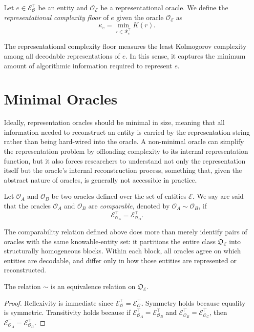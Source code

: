 \begin{definition}
Let $e \in \mathcal{E}_{\mathcal O}^{\top}$ be an entity and $\mathcal{O}_\mathcal{E}$ be a representational oracle. We define the \emph{representational complexity floor} of $e$ given the oracle $\mathcal{O}_\mathcal{E}$ as
\[
\kappa_e = \min_{r \in \mathcal{R}_{e}^{\top}} K(r).
\]
\end{definition}

The representational complexity floor measures the least Kolmogorov complexity among all decodable representations of $e$. In this sense, it captures the minimum amount of algorithmic information required to represent $e$.

%
%

\section{Minimal Oracles}
\label{sec:minimal_oracles}

Ideally, representation oracles should be minimal in size, meaning that all information needed to reconstruct an entity is carried by the representation string rather than being hard-wired into the oracle. A non-minimal oracle can simplify the representation problem by offloading complexity to its internal representation function, but it also forces researchers to understand not only the representation itself but the oracle's internal reconstruction process, something that, given the abstract nature of oracles, is generally not accessible in practice.

\begin{definition}
Let $\mathcal{O}_A$ and $\mathcal{O}_B$ be two oracles defined over the set of entities $\mathcal{E}$. We say are said that the oracles $\mathcal{O}_A$ and $\mathcal{O}_B$ are \emph{comparable}, denoted by $\mathcal O_A \sim \mathcal O_B$, if
\[
\mathcal{E}_{\mathcal{O}_{A}}^{\top} = \mathcal{E}_{\mathcal{O}_{B}}^{\top}.
\]
\end{definition}

The comparability relation defined above does more than merely identify pairs of oracles with the same knowable-entity set: it partitions the entire class $\mathfrak O_{\mathcal E}$ into structurally homogeneous blocks. Within each block, all oracles agree on which entities are decodable, and differ only in how those entities are represented or reconstructed.

\begin{proposition}
The relation \(\sim\) is an equivalence relation on \(\mathfrak O_{\mathcal E}\).
\end{proposition}
\begin{proof}
Reflexivity is immediate since \(\mathcal E^{\top}_{\mathcal O}=\mathcal E^{\top}_{\mathcal O}\).
Symmetry holds because equality is symmetric.
Transitivity holds because if \(\mathcal E^{\top}_{\mathcal O_A}=\mathcal E^{\top}_{\mathcal O_B}\) and
\(\mathcal E^{\top}_{\mathcal O_B}=\mathcal E^{\top}_{\mathcal O_C}\), then
\(\mathcal E^{\top}_{\mathcal O_A}=\mathcal E^{\top}_{\mathcal O_C}\).
\end{proof}

